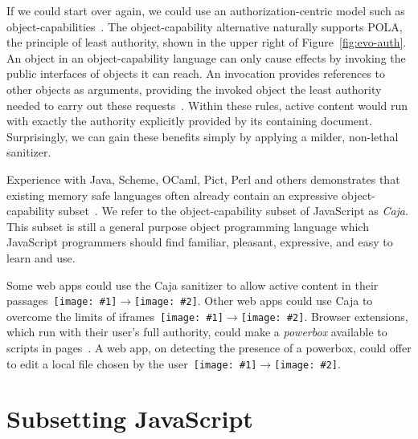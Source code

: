 \documentclass[letterpaper,twocolumn,10pt]{article}
\newcommand{\qq}[2]{{\texttt{[image: \#1]}}$\rightarrow${\texttt{[image: \#2]}}}
\begin{document}
If we could start over again, we could use an authorization-centric model 
such as object-capabilities~\cite{DVH}. The object-capability alternative 
naturally supports POLA, the principle of least authority, shown in the upper 
right of Figure~\ref{fig:evo-auth}. An object in an object-capability 
language can only cause effects by invoking the public interfaces of objects 
it can reach. An invocation provides references to other objects as 
arguments, providing the invoked object the least authority needed to carry 
out these requests~\cite{RobustComposition}. Within these rules, active 
content would run with exactly the authority explicitly provided by its 
containing document. Surprisingly, we can gain these benefits simply by 
applying a milder, non-lethal sanitizer.

Experience with Java, Scheme, OCaml, Pict, Perl and others demonstrates that 
existing memory safe languages often already contain an expressive 
object-capability subset~\cite[respectively]{joe-e, rees96security, emily, 
backwater, caperl}. We refer to the object-capability subset of JavaScript as 
\emph{Caja}. This subset is still a general purpose object programming 
language which JavaScript programmers should find familiar, pleasant, 
expressive, and easy to learn and use. 

Some web apps could use the Caja sanitizer to allow active content in their 
passages~\qq{1}{5}. Other web apps could use Caja to overcome the limits of 
iframes~\qq{3}{5}. Browser extensions, which run with their user's full 
authority, could make a \emph{powerbox} available to scripts in 
pages~\cite{darpareview, stiegler:polaris, seaborn:plash, bitfrost}. A web 
app, on detecting the presence of a powerbox, could offer to edit a local 
file chosen by the user~\qq{4}{6}.

\section{Subsetting JavaScript}
\label{sec:subset}
\end{document}
